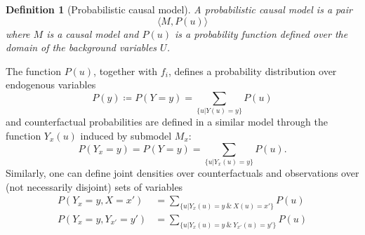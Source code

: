 \documentclass[11pt]{article}
\numberwithin{equation}{section}
\newcommand{\defeq}{\coloneqq}
\newtheorem{defn}{Definition}[section]
\begin{document}
\begin{defn}[Probabilistic causal model]
A probabilistic causal model is a pair
\begin{equation}
\langle M, P(u)\rangle \nonumber
\end{equation}
where $M$ is a causal model and $P(u)$ is a probability function defined over the domain of the background variables $U$.
\end{defn}

The function $P(u)$, together with $f_i$, defines a probability distribution over endogenous variables
\begin{equation}
P(y) \defeq P(Y=y) = \sum_{\{u|Y(u)=y\}} P(u)
\end{equation}
and counterfactual probabilities are defined in a similar model through the function $Y_x(u)$ induced by submodel $M_x$:
\begin{equation}
P(Y_x=y) = P(Y=y) = \sum_{\{u|Y_x(u)=y\}} P(u).
\end{equation}
Similarly, one can define joint densities over counterfactuals and observations over (not necessarily disjoint) sets of variables
\begin{align}
P(Y_x=y, X=x') &= \sum_{\{u|Y_x(u)=y\ \&\ X(u)=x'\}} P(u) \\
P(Y_x=y, Y_{x'}=y') &= \sum_{\{u|Y_x(u)=y\ \&\ Y_{x'}(u)=y'\}} P(u)
\end{align}
\end{document}
